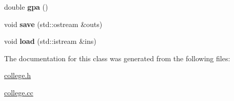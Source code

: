 \begin{DoxyCompactItemize}
\item 
double {\bfseries gpa} ()\hypertarget{classCollege_aaf9bfaa0bc717e96da6365661a96fcd0}{}\label{classCollege_aaf9bfaa0bc717e96da6365661a96fcd0}

\item 
void {\bfseries save} (std\+::ostream \&outs)\hypertarget{classCollege_af6b419f813bc990c0e11f99b78a26899}{}\label{classCollege_af6b419f813bc990c0e11f99b78a26899}

\item 
void {\bfseries load} (std\+::istream \&ins)\hypertarget{classCollege_a11422094ddd907705daede7aa537dd73}{}\label{classCollege_a11422094ddd907705daede7aa537dd73}

\end{DoxyCompactItemize}


The documentation for this class was generated from the following files\+:\begin{DoxyCompactItemize}
\item 
\hyperlink{college_8h}{college.\+h}\item 
\hyperlink{college_8cc}{college.\+cc}\end{DoxyCompactItemize}
